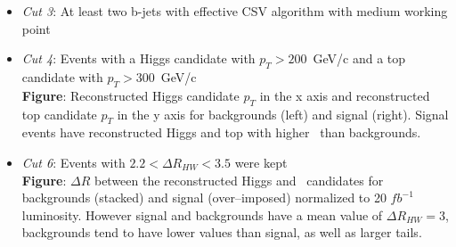 \begin{frame}{}
\vspace{-.2cm}

\begin{columns}
\begin{column}{.50\textwidth}
\begin{block}{}
\begin{itemize}\scriptsize
\item \textit{Cut 3}: At least two b-jets with effective CSV algorithm with medium working point
\item \textit{Cut 4}: Events with a Higgs candidate with $p_{T}>200$~GeV/c and a top candidate with $p_{T}>300$~GeV/c\\
\textbf{Figure}: Reconstructed Higgs candidate $p_{T}$ in the x axis and reconstructed top candidate $p_{T}$ in the y axis for backgrounds (left) and signal (right). Signal events have reconstructed Higgs and top with higher \pt~than backgrounds.
\item \textit{Cut 6}: Events with $2.2<\Delta R_{HW}<3.5$ were kept\\
\textbf{Figure}: $\Delta R$ between the reconstructed Higgs and \W~candidates for backgrounds (stacked) and signal (over--imposed) normalized to 20 $fb^{-1}$ luminosity. However signal and backgrounds have a mean value of $\Delta R_{HW}=3$, backgrounds tend to have lower values than signal, as well as larger tails.
\end{itemize}
\end{block}
\end{column}


\end{columns}
\end{frame}
